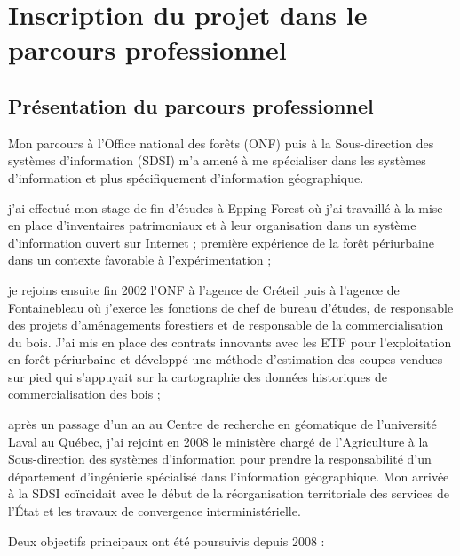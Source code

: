 \section
{Inscription du projet dans le parcours professionnel}

\subsection
{Présentation du parcours professionnel}

Mon parcours à l'Office national des forêts (ONF)
puis à la Sous-direction des systèmes d'information (SDSI)
m'a amené à me spécialiser dans les systèmes d'information
et plus spécifiquement d'information géographique.

\startitemize[n]

\item j'ai effectué mon stage de fin d'études à Epping Forest
      où j'ai travaillé à la mise en place d'inventaires patrimoniaux
      et à leur organisation dans un système d'information
      ouvert sur Internet ; première expérience de la forêt
      périurbaine dans un contexte favorable à l'expérimentation ;

\item je rejoins ensuite fin 2002 l'ONF
      à l'agence de Créteil puis à l'agence de Fontainebleau
      où j'exerce les fonctions de chef de bureau d'études, de responsable
      des projets d'aménagements forestiers et de responsable
      de la commercialisation du bois. J'ai mis en place
      des contrats innovants avec les ETF pour l'exploitation
      en forêt périurbaine et développé une méthode d'estimation
      des coupes vendues sur pied qui s'appuyait sur la cartographie
      des données historiques de commercialisation des bois ;

\item après un passage d'un an au Centre de recherche en géomatique
      de l'université Laval au Québec, j'ai rejoint en 2008 le ministère
      chargé de l'Agriculture à la Sous-direction des systèmes 
      d'information pour prendre la responsabilité
      d'un département d'ingénierie spécialisé dans
      l'information géographique. Mon arrivée à la SDSI
      coïncidait avec le début de la réorganisation territoriale
      des services de l'État et les travaux de convergence
      interministérielle.

\stopitemize

Deux objectifs principaux ont été poursuivis depuis 2008 :

